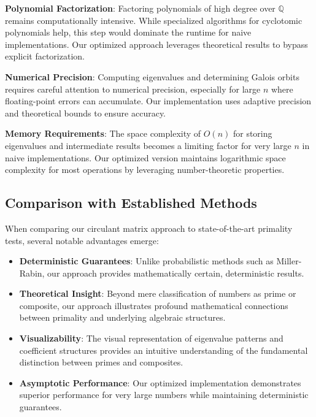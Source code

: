 \textbf{Polynomial Factorization}: Factoring polynomials of high degree over $\mathbb{Q}$ remains computationally intensive. While specialized algorithms for cyclotomic polynomials help, this step would dominate the runtime for naive implementations. Our optimized approach leverages theoretical results to bypass explicit factorization.

\textbf{Numerical Precision}: Computing eigenvalues and determining Galois orbits requires careful attention to numerical precision, especially for large $n$ where floating-point errors can accumulate. Our implementation uses adaptive precision and theoretical bounds to ensure accuracy.

\textbf{Memory Requirements}: The space complexity of $O(n)$ for storing eigenvalues and intermediate results becomes a limiting factor for very large $n$ in naive implementations. Our optimized version maintains logarithmic space complexity for most operations by leveraging number-theoretic properties.

\subsection{Comparison with Established Methods}

When comparing our circulant matrix approach to state-of-the-art primality tests, several notable advantages emerge:

\begin{itemize}
    \item \textbf{Deterministic Guarantees}: Unlike probabilistic methods such as Miller-Rabin, our approach provides mathematically certain, deterministic results.
    
    \item \textbf{Theoretical Insight}: Beyond mere classification of numbers as prime or composite, our approach illustrates profound mathematical connections between primality and underlying algebraic structures.
    
    \item \textbf{Visualizability}: The visual representation of eigenvalue patterns and coefficient structures provides an intuitive understanding of the fundamental distinction between primes and composites.
    
    \item \textbf{Asymptotic Performance}: Our optimized implementation demonstrates superior performance for very large numbers while maintaining deterministic guarantees.
\end{itemize}

